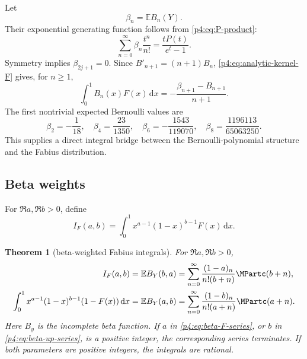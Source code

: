 \documentclass[11pt,oneside]{article}
\newtheorem{theorem}{Theorem}[section]
\theoremstyle{definition}
\theoremstyle{remark}
\newcommand{\F}{F}
\newcommand{\E}{\mathbb E}
\newcommand{\dd}{\,\mathrm d}
\newcommand{\1}{\mathbf 1}
\begin{document}
Let
\begin{equation}\label{p4:eq:beta-n-def}
 \beta_n=\E B_n(Y).
\end{equation}
Their exponential generating function follows from \cref{p4:eq:P-product}:
\begin{equation}\label{p4:eq:beta-egf}
 \sum_{n=0}^{\infty}\beta_n\frac{t^n}{n!}
 =\frac{tP(t)}{e^t-1}.
\end{equation}
Symmetry implies \(\beta_{2j+1}=0\).  Since
\(B'_{n+1}=(n+1)B_n\), \cref{p4:eq:analytic-kernel-F} gives, for \(n\ge1\),
\begin{equation}\label{p4:eq:Bernoulli-F-integral}
 \int_0^1B_n(x)\F(x)\dd x
 =-\frac{\beta_{n+1}-B_{n+1}}{n+1}.
\end{equation}
The first nontrivial expected Bernoulli values are
\begin{equation}\label{p4:eq:beta-values}
 \beta_2=-\frac1{18},\quad
 \beta_4=\frac{23}{1350},\quad
 \beta_6=-\frac{1543}{119070},\quad
 \beta_8=\frac{1196113}{65063250}.
\end{equation}
This supplies a direct integral bridge between the Bernoulli-polynomial structure and
the Fabius distribution.

\subsection{Beta weights}

For \(\Re a,\Re b>0\), define
\begin{equation}\label{p4:eq:IFab}
 I_F(a,b)=\int_0^1x^{a-1}(1-x)^{b-1}\F(x)\dd x.
\end{equation}

\begin{theorem}[beta-weighted Fabius integrals]\label{p4:thm:beta-F}
For \(\Re a,\Re b>0\),
\begin{align}
 I_F(a,b)
 &=\E B_Y(b,a)
 =\sum_{n=0}^{\infty}
 \frac{(1-a)_n}{n!(b+n)}\MPartc(b+n),
 \label{p4:eq:beta-F-series}\\
 \int_0^1x^{a-1}(1-x)^{b-1}(1-\F(x))\dd x
 &=\E B_Y(a,b)
 =\sum_{n=0}^{\infty}
 \frac{(1-b)_n}{n!(a+n)}\MPartc(a+n).
 \label{p4:eq:beta-up-series}
\end{align}
Here \(B_y\) is the incomplete beta function.  If \(a\) in
\cref{p4:eq:beta-F-series}, or \(b\) in \cref{p4:eq:beta-up-series}, is a positive integer,
the corresponding series terminates.  If both parameters are positive integers, the
integrals are rational.
\end{theorem}
\end{document}

